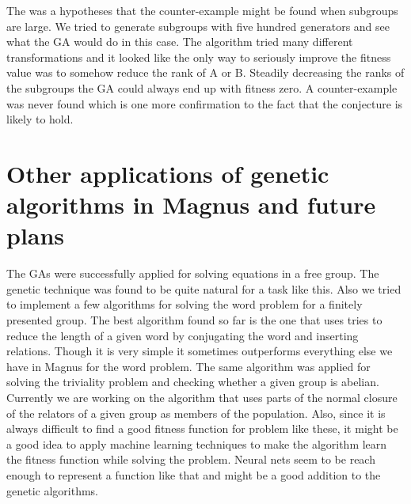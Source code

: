 \documentclass[11pt]{article}
\begin{document}
The was a hypotheses that the counter-example might be found when
subgroups are large. We tried to generate subgroups with five hundred
generators and see what the GA would do in this case. The algorithm
tried many different transformations and it looked like the only way to
seriously improve the fitness value was to somehow reduce the rank of
A or B. Steadily decreasing the ranks of the subgroups the GA could
always end up with fitness zero. A counter-example was never found
which is one more confirmation to the fact that the conjecture is
likely to hold.


\section{Other applications of genetic algorithms in Magnus and future plans}

The GAs were successfully applied for solving equations in a free
group. The genetic technique was found to be quite natural for a task
like this. Also we tried to implement a few algorithms for solving the
word problem for a finitely presented group. The best algorithm found
so far is the one that uses tries to reduce the length of a given word
by conjugating the word and inserting relations. Though it is very
simple it sometimes outperforms everything else we have in Magnus for
the word problem. The same algorithm was applied for solving the
triviality problem and checking whether a given group is
abelian. Currently we are working on the algorithm that uses parts of
the normal closure of the relators of a given group as members of the
population. Also, since it is always difficult to find a good fitness
function for problem like these, it might be a good idea to apply
machine learning techniques to make the algorithm learn the fitness
function while solving the problem. Neural nets seem to be reach
enough to represent a function like that and might be a good addition
to the genetic algorithms.
\end{document}
